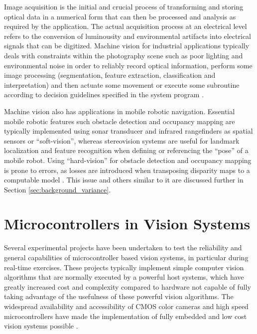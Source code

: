 \documentclass[11pt, a4paper, oneside]{Thesis} %
\begin{document}
Image acquisition is the initial and crucial process of transforming and storing optical data in a numerical form that can then be processed and analysis as required by the application. The actual acquisition process at an electrical level refers to the conversion of luminousity and environmental artifacts into electrical signals that can be digitized. Machine vision for industrial applications typically deals with constraints within the photography scene such as poor lighting and environmental noise in order to reliably record optical information, perform some image processing (segmentation, feature extraction, classification and interpretation) and then actuate some movement or execute some subroutine according to decision guidelines specified in the system program \cite{golnabi2007design}.

Machine vision also has applications in mobile robotic navigation. Essential mobile robotic features such obstacle detection and occupancy mapping are typically implemented using sonar transducer and infrared rangefinders as spatial sensors or ``soft-vision'', whereas stereovision systems are useful for landmark localization and feature recognition when defining or referencing the ``pose'' of a mobile robot. Using ``hard-vision'' for obstacle detection and occupancy mapping is prone to errors, as losses are introduced when transposing disparity maps to a computable model \cite{murray2000using}. This issue and others similar to it are discussed further in Section \ref{sec:background_variance}. 

\section{Microcontrollers in Vision Systems}
Several experimental projects have been undertaken to test the reliability and general capabilities of microcontroller based vision systems, in particular during real-time exercises. These projects typically implement simple computer vision algorithms that are normally executed by a powerful host systems, which have greatly increased cost and complexity compared to hardware not capable of fully taking advantage of the usefulness of these powerful vision algorithms. The widespread availability and accessibility of CMOS color cameras and high speed microcontrollers have made the implementation of fully embedded and low cost vision systems possible \cite{rowe2002low}.
\end{document}
